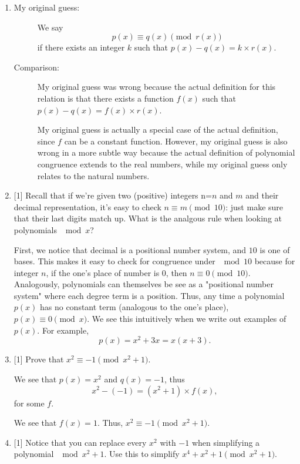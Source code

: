 \documentclass{article}
\begin{document}
\begin{enumerate}
    \item {
        \begin{description}
            \item[My original guess:] {
                We say 
                \[p(x) \equiv q(x) \pmod{r(x)}\]
                if there exists an integer \(k\) such that \(p(x) - q(x) = k \times r(x)\).
            }
            \item[Comparison:] {
                My original guess was wrong because the actual definition for 
                this relation is that there exists a function \(f(x)\) such that 
                \(p(x) - q(x) = f(x) \times r(x)\).

                My original guess is actually a special case of the actual definition,
                since \(f\) can be a constant function. However, my original guess 
                is also wrong in a more subtle way because the actual definition of 
                polynomial congruence extends to the real numbers, while my 
                original guess only relates to the natural numbers.
            }
        \end{description}
    }

    \item {
        [1] Recall that if we're given two (positive) integers n=\(n\) and \(m\)
        and their decimal representation, it's easy to check \(n  \equiv m \pmod{10}\):
        just make sure that their last digits match up. What is the analgous rule 
        when looking at polynomials \(\mod{x}\)?

        First, we notice that decimal is a positional number system, and \(10\)
        is one of bases. This makes it easy to check for congruence under \(\mod{10}\)
        because for integer \(n\), if the one's place of number is 0, then 
        \(n \equiv 0 \pmod{10}\). Analogously, polynomials can themselves be see 
        as a "positional number system" where each degree term is a position. Thus, 
        any time a polynomial \(p(x)\) has no constant term (analogous to the one's place), 
        \(p(x) \equiv 0 \pmod{x}\). We see this intuitively when we write out 
        examples of \(p(x)\). For example,
        \[p(x) = x^2 + 3x = x(x + 3).\]
    }

    \item {
        [1] Prove that \(x^2 \equiv -1 \pmod{x^2 + 1}\).

        We see that \(p(x) = x^2\) and \(q(x) = -1\), thus 
        \[x^2 - (-1) = (x^2 + 1) \times f(x),\]
        for some \(f\). 

        We see that \(f(x) = 1\). Thus, \(x^2 \equiv -1 \pmod{x^2 + 1}\).
    }

    \item {
        [1] Notice that you can replace every \(x^2\) with \(-1\) when simplifying 
        a polynomial \(\mod{x^2 + 1}\). Use this to simplify \(x^4 + x^2 + 1 \pmod{x^2 + 1}\).

    }
\end{enumerate}
\end{document}
